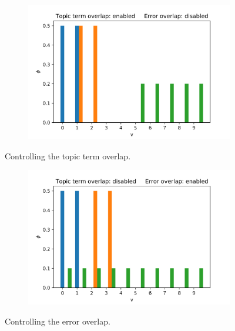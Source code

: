\documentclass{mpaper}
\begin{document}
\begin{figure}
  \begin{subfigure}[b]{0.48\textwidth}
    \includegraphics[width=\linewidth]{phi_topic-ol_error-nonol.png}
  \end{subfigure}%
   \caption{Controlling the topic term overlap.}
  \label{fig:ol_terms}

  \begin{subfigure}[b]{0.48\textwidth}
    \includegraphics[width=\linewidth]{phi_topic-nonol_error-ol.png}
  \end{subfigure}%
   \caption{Controlling the error overlap.}
  \label{fig:ol_error}
\end{figure}
\end{document}
